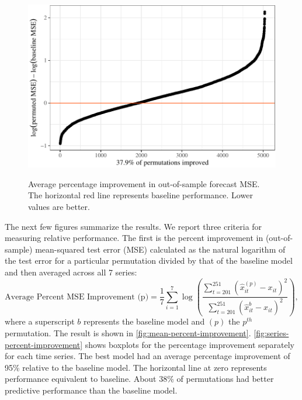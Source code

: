 \documentclass[11pt]{article}
\renewcommand{\hat}{\widehat}
\begin{document}
\begin{figure}[t]
{\centering \includegraphics{gfx/mean-percent-improvement-1} }
\caption{Average percentage improvement in out-of-sample forecast MSE. The horizontal red line represents baseline performance. Lower values are better.}\label{fig:mean-percent-improvement}
\end{figure}

The next few figures summarize the results. We report three criteria for
measuring relative performance. The first is the percent improvement in
(out-of-sample) mean-squared test error (MSE) calculated as the natural
logarithm of the test error for a particular permutation divided by that
of the baseline model and then averaged across all 7 series:
\begin{equation}
  \mbox{Average Percent MSE Improvement (p)} = \frac{1}{7} \sum_{i=1}^7 \log
  \left(\frac{\sum_{t=201}^{251} (\hat{x}_{it}^{(p)}-x_{it})^2}
    {\sum_{t=201}^{251} (\hat{x}_{it}^{b}-x_{it})^2}\right),
\end{equation} where a superscript \(b\) represents the baseline model
and \((p)\) the \(p^{th}\) permutation. The result is shown in
\autoref{fig:mean-percent-improvement}.
\autoref{fig:series-percent-improvement} shows boxplots for the
percentage improvement separately for each time series. The best model
had an average percentage improvement of 95\% relative to the baseline
model. The horizontal line at zero represents performance equivalent to
baseline. About 38\% of permutations had better predictive performance
than the baseline model.
\end{document}
